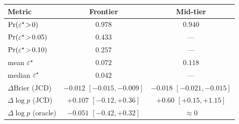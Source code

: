 \begin{tabular}{@{}lcc@{}}
\toprule
Metric                       & Frontier                    & Mid-tier                   \\
\midrule
$\Pr(\varepsilon^\star\!>\!0)$      & $0.978$                     & $0.940$                    \\
$\Pr(\varepsilon^\star\!>\!0.05)$   & $0.433$                     & ---                        \\
$\Pr(\varepsilon^\star\!>\!0.10)$   & $0.257$                     & ---                        \\
mean $\varepsilon^\star$            & $0.072$                     & $0.118$                    \\
median $\varepsilon^\star$          & $0.042$                     & ---                        \\
$\Delta\mathrm{Brier}$ (JCD) & $-0.012$ $[-0.015,-0.009]$  & $-0.018$ $[-0.021,-0.015]$ \\
$\Delta\log p$ (JCD)         & $+0.107$ $[-0.12,+0.36]$    & $+0.60$ $[+0.15,+1.15]$    \\
$\Delta\log p$ (oracle)      & $-0.051$ $[-0.42,+0.32]$    & $\approx 0$                \\
\bottomrule
\end{tabular}
